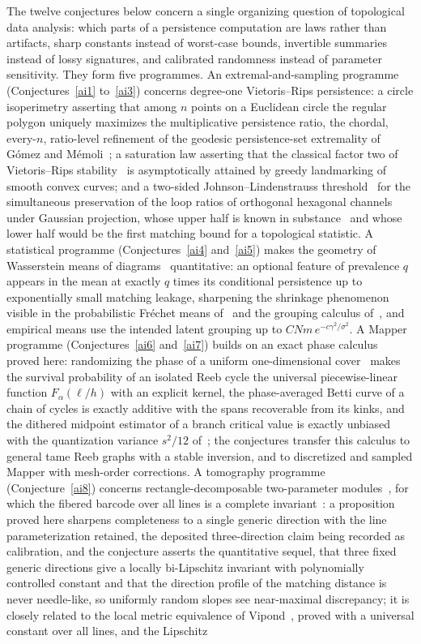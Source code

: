 \documentclass[11pt]{article}
\theoremstyle{definition}
\begin{document}
The twelve conjectures below concern a single organizing question of topological data analysis: which parts of a persistence computation are laws rather than artifacts, sharp constants instead of worst-case bounds, invertible summaries instead of lossy signatures, and calibrated randomness instead of parameter sensitivity.  They form five programmes.  An extremal-and-sampling programme (Conjectures~\ref{ai1} to~\ref{ai3}) concerns degree-one Vietoris--Rips persistence: a circle isoperimetry asserting that among $n$ points on a Euclidean circle the regular polygon uniquely maximizes the multiplicative persistence ratio, the chordal, every-$n$, ratio-level refinement of the geodesic persistence-set extremality of G\'omez and M\'emoli~\cite{GoM24}; a saturation law asserting that the classical factor two of Vietoris--Rips stability~\cite{CSO14} is asymptotically attained by greedy landmarking of smooth convex curves; and a two-sided Johnson--Lindenstrauss threshold~\cite{JL84,LN17} for the simultaneous preservation of the loop ratios of orthogonal hexagonal channels under Gaussian projection, whose upper half is known in substance~\cite{Lot19,MKG24} and whose lower half would be the first matching bound for a topological statistic.  A statistical programme (Conjectures~\ref{ai4} and~\ref{ai5}) makes the geometry of Wasserstein means of diagrams~\cite{MMH11,TMMH14} quantitative: an optional feature of prevalence $q$ appears in the mean at exactly $q$ times its conditional persistence up to exponentially small matching leakage, sharpening the shrinkage phenomenon visible in the probabilistic Fr\'echet means of~\cite{MTB15} and the grouping calculus of~\cite{CaM24}, and empirical means use the intended latent grouping up to $CNm\,e^{-c\gamma^2/\sigma^2}$.  A Mapper programme (Conjectures~\ref{ai6} and~\ref{ai7}) builds on an exact phase calculus proved here: randomizing the phase of a uniform one-dimensional cover~\cite{CO18} makes the survival probability of an isolated Reeb cycle the universal piecewise-linear function $F_\alpha(\ell/h)$ with an explicit kernel, the phase-averaged Betti curve of a chain of cycles is exactly additive with the spans recoverable from its kinks, and the dithered midpoint estimator of a branch critical value is exactly unbiased with the quantization variance $s^2/12$ of~\cite{Sch64}; the conjectures transfer this calculus to general tame Reeb graphs with a stable inversion, and to discretized and sampled Mapper with mesh-order corrections.  A tomography programme (Conjecture~\ref{ai8}) concerns rectangle-decomposable two-parameter modules~\cite{BL23}, for which the fibered barcode over all lines is a complete invariant~\cite{BLO22}: a proposition proved here sharpens completeness to a single generic direction with the line parameterization retained, the deposited three-direction claim being recorded as calibration, and the conjecture asserts the quantitative sequel, that three fixed generic directions give a locally bi-Lipschitz invariant with polynomially controlled constant and that the direction profile of the matching distance is never needle-like, so uniformly random slopes see near-maximal discrepancy; it is closely related to the local metric equivalence of Vipond~\cite{Vip20}, proved with a universal constant over all lines, and the Lipschitz 
\end{document}
